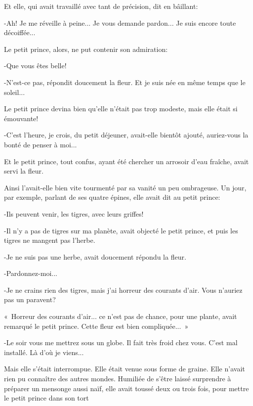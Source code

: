 \documentclass{report}
\begin{document}
Et elle, qui avait travaillé avec tant de précision, dit en bâillant:

-Ah! Je me réveille à peine... Je vous demande pardon... Je suis encore toute décoiffée...

Le petit prince, alors, ne put contenir son admiration:

-Que vous êtes belle!

-N'est-ce pas, répondit doucement la fleur. Et je suis née en même temps que le soleil...


Le petit prince devina bien qu'elle n'était pas trop modeste, mais elle était si émouvante!

-C'est l'heure, je crois, du petit déjeuner, avait-elle bientôt ajouté, auriez-vous la bonté de penser à moi...


Et le petit prince, tout confus, ayant été chercher un arrosoir d'eau fraîche, avait servi la fleur.

Ainsi l'avait-elle bien vite tourmenté par sa vanité un peu ombrageuse. Un jour, par exemple, parlant de ses quatre épines, elle avait dit au petit prince:

-Ils peuvent venir, les tigres, avec leurs griffes!

-Il n'y a pas de tigres sur ma planète, avait objecté le petit prince, et puis les tigres ne mangent pas l'herbe. 


-Je ne suis pas une herbe, avait doucement répondu la fleur.

-Pardonnez-moi...

-Je ne crains rien des tigres, mais j'ai horreur des courants d'air. Vous n'auriez pas un paravent?

«~Horreur des courants d'air... ce n'est pas de chance, pour une plante, avait remarqué le petit prince. Cette fleur est bien compliquée...~»

-Le soir vous me mettrez sous un globe. Il fait très froid chez vous. C'est mal installé. Là d'où je viens...

Mais elle s'était interrompue. Elle était venue sous forme de graine. Elle n'avait rien pu connaître des autres mondes. Humiliée de s'être laissé surprendre à préparer un mensonge aussi naïf, elle avait toussé deux ou trois fois, pour mettre le petit prince dans son tort 

\end{document}

